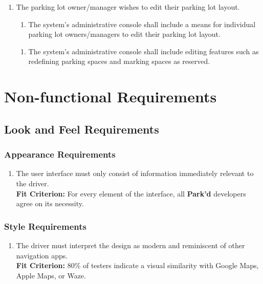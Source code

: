 \documentclass[12pt,letterpaper]{article}
\newcounter{businesseventnum}
\newcounter{funcreqnum}
\begin{document}
\begin{enumerate}[{BE}\thebusinesseventnum.] 
\item The parking lot owner/manager wishes to edit their parking lot layout.
\begin{enumerate}[{FR}\thefuncreqnum.] 
    \item The system's administrative console shall include a means for individual parking lot owners/managers to edit their parking lot layout.
\end{enumerate}
\begin{enumerate}[{FR}\thefuncreqnum.] 
    \item The system's administrative console shall include editing features such as redefining parking spaces and marking spaces as reserved.
\end{enumerate}
\end{enumerate}

\newpage
\section{Non-functional Requirements}
\subsection{Look and Feel Requirements}
\subsubsection{Appearance Requirements}
\begin{enumerate}[{LF}1.] 
    \item The user interface must only consist of information immediately relevant to the driver. \label{pocnf1} \\
    \textbf{Fit Criterion:} For every element of the interface, all \textbf{Park'd} developers agree on its necessity.
\end{enumerate}

\subsubsection{Style Requirements}
\begin{enumerate}[resume*]  
    \item The driver must interpret the design as modern and reminiscent of other navigation apps.\\
    \textbf{Fit Criterion:} 80\% of testers indicate a visual similarity with Google Maps, Apple Maps, or Waze.
\end{enumerate}
\end{document}
